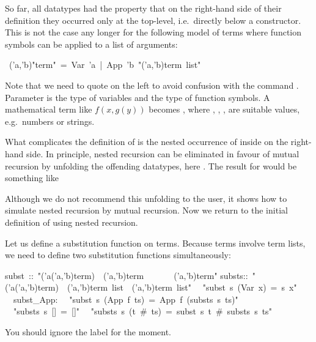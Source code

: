 \begin{isabelle}%
%
\begin{isamarkuptext}%
So far, all datatypes had the property that on the right-hand side of their
definition they occurred only at the top-level, i.e.\ directly below a
constructor. This is not the case any longer for the following model of terms
where function symbols can be applied to a list of arguments:%
\end{isamarkuptext}%
\ ('a,'b){"}term{"}\ =\ Var\ 'a\ |\ App\ 'b\ {"}('a,'b)term\ list{"}%
\begin{isamarkuptext}%
\noindent
Note that we need to quote  on the left to avoid confusion with
the command .
Parameter  is the type of variables and  the type of
function symbols.
A mathematical term like $f(x,g(y))$ becomes , where , , ,  are
suitable values, e.g.\ numbers or strings.

What complicates the definition of  is the nested occurrence of
 inside  on the right-hand side. In principle,
nested recursion can be eliminated in favour of mutual recursion by unfolding
the offending datatypes, here . The result for 
would be something like
\medskip


\medskip

\noindent
Although we do not recommend this unfolding to the user, it shows how to
simulate nested recursion by mutual recursion.
Now we return to the initial definition of  using
nested recursion.

Let us define a substitution function on terms. Because terms involve term
lists, we need to define two substitution functions simultaneously:%
\end{isamarkuptext}%
\isanewline
subst\ ::\ {"}('a{\isasymRightarrow}('a,'b)term)\ {\isasymRightarrow}\ ('a,'b)term\ \ \ \ \ \ {\isasymRightarrow}\ ('a,'b)term{"}\isanewline
substs::\ {"}('a{\isasymRightarrow}('a,'b)term)\ {\isasymRightarrow}\ ('a,'b)term\ list\ {\isasymRightarrow}\ ('a,'b)term\ list{"}\isanewline
\isanewline
{}\isanewline
\ \ {"}subst\ s\ (Var\ x)\ =\ s\ x{"}\isanewline
\ \ subst\_App:\isanewline
\ \ {"}subst\ s\ (App\ f\ ts)\ =\ App\ f\ (substs\ s\ ts){"}\isanewline
\isanewline
\ \ {"}substs\ s\ []\ =\ []{"}\isanewline
\ \ {"}substs\ s\ (t\ \#\ ts)\ =\ subst\ s\ t\ \#\ substs\ s\ ts{"}%
\begin{isamarkuptext}%
\noindent
You should ignore the label  for the moment.


\end{isamarkuptext}
\end{isabelle}

